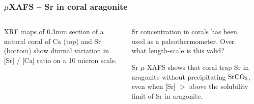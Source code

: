 \begin{frame}\frametitle{${\mu}$XAFS -- Sr in coral aragonite}


  \begin{columns}[T]
    \begin{column}{45mm}
      \hspace{2mm} {}

      \hspace{2mm} {}
      \begin{minipage}{45mm}
        XRF maps of 0.3mm section of a natural coral of Ca (top) and Sr
        (bottom) show diurnal variation in [Sr] / [Ca] ratio on a 10 micron
        scale.
      \end{minipage}
      \vmm

      {\small{}}

    \end{column}
    \begin{column}{58mm}

    \begin{minipage}{58mm}

      Sr concentration in corals has been used as a paleothermometer.
      Over what length-scale is this valid?

      \vmm {}
      \vmm
    \end{minipage}

    {}

    \begin{minipage}{58mm}

      Sr $\mu$-XAFS shows that coral trap Sr in aragonite without
      precipitating $\rm SrCO_3$, even when [Sr] $>$ above the solubility
      limit of Sr in aragonite.

    \end{minipage}
  \end{column}
\end{columns}
\end{frame}


